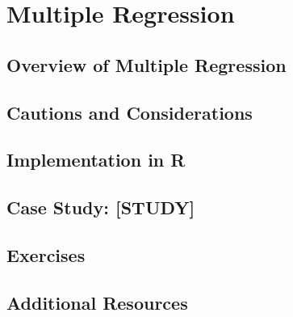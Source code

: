 
\chapter{Multiple Regression}

\section{Overview of Multiple Regression}

\section{Cautions and Considerations}

\section{Implementation in R}

\section{Case Study: [STUDY]}

\section{Exercises}

\section{Additional Resources}
